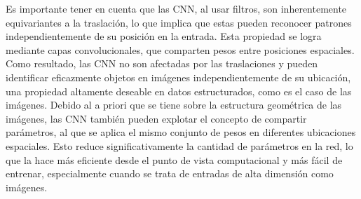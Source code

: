 \documentclass[12pt,letterpaper,final, openany]{scrbook}
\begin{document}

Es importante tener en cuenta que las CNN, al usar filtros, son inherentemente equivariantes a la traslación, lo que implica que estas pueden reconocer patrones independientemente de su posición en la entrada. Esta propiedad se logra mediante capas convolucionales, que comparten pesos entre posiciones espaciales. Como resultado, las CNN no son afectadas por las traslaciones y pueden identificar eficazmente objetos en imágenes independientemente de su ubicación, una propiedad altamente deseable en datos estructurados, como es el caso de las imágenes. Debido al a priori que se tiene sobre la estructura geométrica de las imágenes, las CNN también pueden explotar el concepto de compartir parámetros, al que se aplica el mismo conjunto de pesos en diferentes ubicaciones espaciales. Esto reduce significativamente la cantidad de parámetros en la red, lo que la hace más eficiente desde el punto de vista computacional y más fácil de entrenar, especialmente cuando se trata de entradas de alta dimensión como imágenes.


\end{document}
